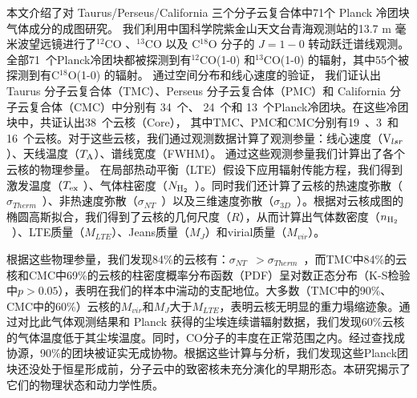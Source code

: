 \documentclass[UTF8, nocolorlinks]{pkuthss}
\newcommand{\coa}{$^{12}$CO }
\newcommand{\cob}{$^{13}$CO }
\newcommand{\coc}{C$^{18}$O }
\newcommand{\coaa}{$^{12}$CO(1-0) }
\newcommand{\cobb}{$^{13}$CO(1-0) }
\newcommand{\cocc}{C$^{18}$O(1-0) }
\newcommand{\vlsr}{${\rm V } _{lsr}$}
\newcommand{\ta}{$T_{\rm A}$}
\newcommand{\texc}{$T_{\rm {ex}}$ }
\newcommand{\nhyd}{$N_{\rm H_2}$\ }
\newcommand{\nnhyd}{$n_{\rm H_2}$\ }
\newcommand{\sigmath}{$\sigma _{Therm}$\ }
\newcommand{\sigmant}{$\sigma _{NT}$\ }
\newcommand{\sigmatd}{$\sigma _{3D}$\ }
\newcommand{\numsou}{71\ }
\newcommand{\numsoutmc}{34\ }
\newcommand{\numsoupmc}{13\ }
\newcommand{\numsoucmc}{24\ }
\newcommand{\numcore}{38\ }
\newcommand{\numcoretmc}{19\ }
\newcommand{\numcorepmc}{3\ }
\newcommand{\numcorecmc}{16\ }
\begin{document}
	\frontmatter
	\maketitle

\begin{cabstract}

	本文介绍了对 Taurus/Perseus/California 三个分子云复合体中71个 Planck 冷团块气体成分的成图研究。 我们利用中国科学院紫金山天文台青海观测站的13.7 m 毫米波望远镜进行了\coa、\cob 以及 \coc 分子的 $J=1-0$ 转动跃迁谱线观测。全部\numsou 个Planck冷团块都被探测到有\coaa 和\cobb 的辐射，其中55个被探测到有\cocc 的辐射。 通过空间分布和线心速度的验证， 我们证认出 Taurus 分子云复合体（TMC）、Perseus 分子云复合体（PMC）和 California 分子云复合体（CMC）中分别有 \numsoutmc 个、 \numsoucmc 个和 \numsoupmc 个Planck冷团块。在这些冷团块中，共证认出\numcore 个云核（Core）， 其中TMC、PMC和CMC分别有\numcoretmc、\numcorepmc 和\numcorecmc 个云核。对于这些云核，我们通过观测数据计算了观测参量：线心速度（\vlsr ）、天线温度（\ta ）、谱线宽度（FWHM）。 通过这些观测参量我们计算出了各个云核的物理参量。 在局部热动平衡（LTE）假设下应用辐射传能方程，我们得到激发温度（\texc ）、气体柱密度（\nhyd ）。同时我们还计算了云核的热速度弥散（\sigmath ）、非热速度弥散（\sigmant ）以及三维速度弥散（\sigmatd ）。根据对云核成图的椭圆高斯拟合，我们得到了云核的几何尺度（$R$），从而计算出气体数密度（\nnhyd ）、LTE质量（$M_{LTE}$）、Jeans质量（$M_{J}$）和virial质量（$M_{vir}$）。

	根据这些物理参量，我们发现84\%的云核有：\sigmant $>$\sigmath ，而TMC中84\%的云核和CMC中69\%的云核的柱密度概率分布函数（PDF）呈对数正态分布（K-S检验中$p>0.05$），表明在我们的样本中湍动的支配地位。大多数（TMC中的90\%、CMC中的60\%）云核的$M_{vir}$和$M_{J}$大于$M_{LTE}$，表明云核无明显的重力塌缩迹象。通过对比此气体观测结果和 Planck 获得的尘埃连续谱辐射数据，我们发现60\%云核的气体温度低于其尘埃温度。同时，CO分子的丰度在正常范围之内。经过查找成协源，90\%的团块被证实无成协物。根据这些计算与分析，我们发现这些Planck团块还没处于恒星形成前，分子云中的致密核未充分演化的早期形态。本研究揭示了它们的物理状态和动力学性质。
\end{cabstract}
\end{document}
